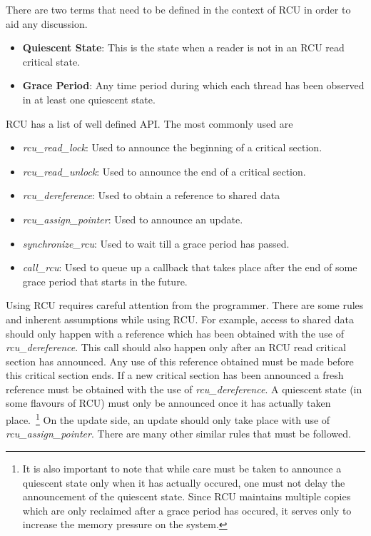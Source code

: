 There are two terms that need to be defined in the context of RCU in order to aid
any discussion.
\begin{itemize}
\item{\bf Quiescent State}: This is the state when a reader is not in an RCU read critical state.
\item{\bf Grace Period}: Any time period during which each thread has been observed in at least one quiescent state.
\end{itemize}

RCU has a list of well defined API. The most commonly used are
\begin{itemize}
\item\emph{rcu\_read\_lock}: Used to announce the beginning of a critical section.
\item\emph{rcu\_read\_unlock}: Used to announce the end of a critical section.
\item\emph{rcu\_dereference}: Used to obtain a reference to shared data
\item\emph{rcu\_assign\_pointer}: Used to announce an update.
\item\emph{synchronize\_rcu}: Used to wait till a grace period has passed.
\item\emph{call\_rcu}: Used to queue up a callback that takes place after the end of some grace period that starts in the future.
\end{itemize}


Using RCU requires careful attention from the programmer. There are some rules
and inherent assumptions while using RCU. For example, access to shared data
should only happen with a reference which has been obtained with the use of
\emph{rcu\_dereference}. This call should also happen only after an RCU read critical
section has announced. Any use of this reference obtained must be made before
this critical section ends. If a new critical section has been announced a
fresh reference must be obtained with the use of \emph{rcu\_dereference}. A quiescent
state (in some flavours of RCU) must only be announced once it has actually
taken place.~\footnote{It is also important to note that while care must be taken to announce a
quiescent state only when it has actually occured, one must not delay the announcement
of the quiescent state. Since RCU maintains multiple copies which are only reclaimed
after a grace period has occured, it serves only to increase the memory pressure on
the system.} On the update side, an update should only take place with use
of \emph{rcu\_assign\_pointer}. There are many other similar rules that must be
followed.
